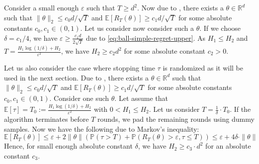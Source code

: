 Consider a small enough $\varepsilon$ such that $T\geq d^2$.
Now due to \cite{chen2024assouad}, there exists a $\theta\in\mathbb{R}^d$ such that $\|\theta\|_2\leq c_0d/\sqrt{T}$ and $\mathbb E[R_T(\theta)]\geq c_1d/\sqrt{T}$ for some absolute constants $c_0,c_1\in (0,1)$. Let us consider now consider such a $\theta$. If we choose $\delta=c_1/4$, we have $\varepsilon\geq \frac{c_1d}{2\sqrt{T}}$ due to \eqref{eq:ball-simple-regret-upper}. As $H_1\leq H_2$ and $T=\frac{H_1\log(1/\delta)+H_2}{\varepsilon^2}$, we have $H_2\geq c_2 d^2$ for some absolute constant $c_2>0$.


Let us also consider the case where stopping time $\tau$ is randomized as it will be used in the next section. Due to \cite{chen2024assouad}, there exists a $\theta\in\mathbb{R}^d$ such that $\|\theta\|_2\leq c_0d/\sqrt{T}$ and $\mathbb E[R_T(\theta)]\geq c_1d/\sqrt{T}$ for some absolute constants $c_0,c_1\in (0,1)$. Consider one such $\theta$. Let assume that $\mathbb{E}[\tau]=T_0:=\frac{H_1\log(1/\delta)+H_2}{\varepsilon^2}$ with $0<H_1\leq H_2$. Let us consider $T=\frac{1}{\delta}\cdot T_0 $. If the algorithm terminates before $T$ rounds, we pad the remaining rounds using dummy samples. Now we have the following due to Markov's inequality:
\[
   \mathbb E[R_T(\theta)]\leq \varepsilon +2 \|\theta\|( \mathbb{P}(\tau>T)+\mathbb{P}(R_T(\theta)>\varepsilon,\tau\leq T))\leq \varepsilon +4\delta\cdot \|\theta\|
\]
Hence, for small enough absolute constant $\delta$, we have $H_2\geq c_3\cdot d^2$ for an absolute constant $c_3$.



